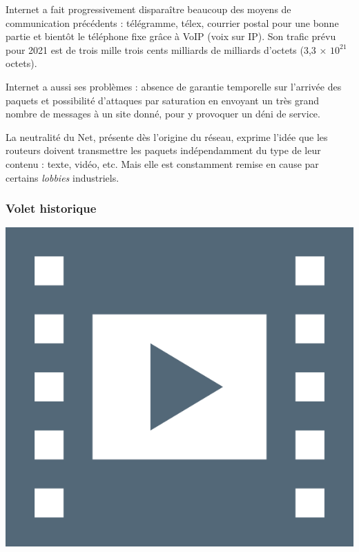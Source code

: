 \begin{tcolorbox}[title={Impacts sur les pratiques humaines}, toprule=0pt, leftrule=0pt, rightrule=0pt, arc=0pt,
                  fonttitle=\scshape\boxtitlefont,
                  colbacktitle=white, coltitle=firstcolor, colframe=firstcolor, colback=firstcolor!10,
                  breakable, enhanced jigsaw]
Internet a fait progressivement disparaître beaucoup des moyens de communication précédents : télégramme, télex, courrier postal pour une bonne partie et bientôt le téléphone fixe grâce à VoIP (voix sur IP).
Son trafic prévu pour 2021 est de trois mille trois cents milliards de milliards d’octets (3,3 × $10^{21}$ octets).

Internet a aussi ses problèmes : absence de garantie temporelle sur l’arrivée des paquets et possibilité d’attaques par saturation en envoyant un très grand nombre de messages à un site donné, pour y provoquer un déni de service.

La neutralité du Net, présente dès l’origine du réseau, exprime l’idée que les routeurs doivent transmettre les paquets indépendamment du type de leur contenu : texte, vidéo, etc. Mais elle est constamment remise en cause par certains \textit{lobbies} industriels. 
\end{tcolorbox}

\subsubsection[Volet historique]{Volet historique}
\label{subsub:IX.1.1.2}

\begin{marginvideo}
	[\label{vid:IX.2}Naissance de l'Internet.]%
	\href{https://pixees.fr/classcode/formations/module4/}%
	  {\includegraphics[width=\marginparwidth]{./Images/Pictograms/film-strip-dark-electric-blue.png}}%
\end{marginvideo}

